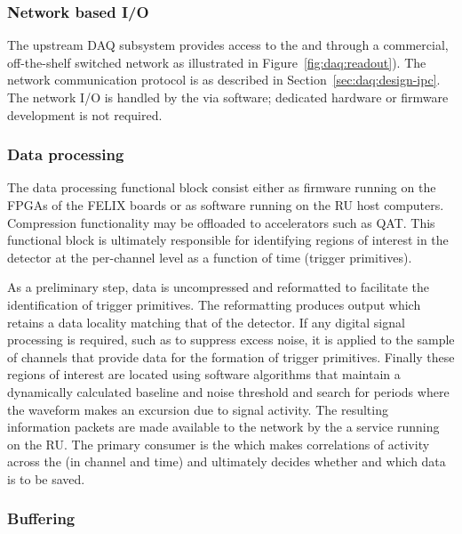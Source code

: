 \subsubsection{Network based I/O}
\label{sec:daq:upstream-io}

The upstream DAQ subsystem provides access to the  and  through a commercial, off-the-shelf switched network as illustrated in Figure~\ref{fig:daq:readout}).
The network communication protocol is as described in Section~\ref{sec:daq:design-ipc}.
The network I/O is handled by the  via software; dedicated hardware or firmware development is not required.

\subsubsection{Data processing}
\label{sec:daq:upstream-proc}

The data processing functional block consist either as firmware running on the
FPGAs of the FELIX boards or as software running on the RU host computers.
Compression functionality may be offloaded to accelerators such as QAT.
This functional block is ultimately responsible for identifying regions of
interest in the detector at the per-channel level as a function of time (trigger
primitives).

As a preliminary step, data is uncompressed and reformatted to facilitate the
identification of trigger primitives.
The reformatting produces output which retains a data locality matching that of
the detector.
If any digital signal processing is required, such as to suppress excess noise,
it is applied to the sample of channels that provide data for the formation of
trigger primitives.
Finally these regions of interest are located using software algorithms that
maintain a dynamically calculated baseline and noise threshold and search for
periods where the waveform makes an excursion due to signal activity. 
The resulting  information packets are made available to
the network by the a service running on the RU.
The primary consumer is the  which makes correlations of activity
across the  (in channel and time) and ultimately decides
whether and which data is to be saved.


\subsubsection{Buffering}
\label{sec:daq:upstream-buf}


